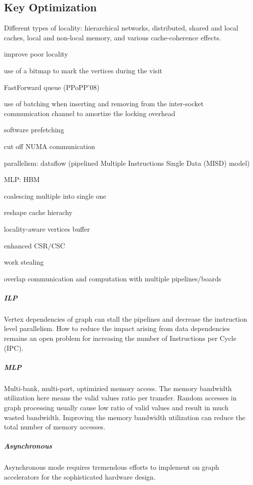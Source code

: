 \documentclass[UTF8,12pt,a4paper]{article}
\begin{document}
\subsection{Key Optimization}
Different types of locality:
hierarchical networks, distributed,
shared and local caches, local and non-local memory,
and various cache-coherence effects.
\begin{compactitem}
  \item improve poor locality
  \item use of a bitmap to mark the vertices during the visit
  \item FastForward queue (PPoPP'08)
  \item use of batching when inserting and removing
  from the inter-socket communication channel to amortize the locking overhead
  \item software prefetching
  \item cut off NUMA communication
  \item parallelism: dataflow (pipelined Multiple Instructions Single Data (MISD) model)
  \item MLP: HBM
  \item coalescing multiple into single one
  \item reshape cache hierachy
  \item locality-aware vertices buffer
  \item enhanced CSR/CSC
  \item work stealing
  \item overlap communication and computation with multiple pipelines/boards
\end{compactitem}

\subparagraph{ILP}
Vertex dependencies of graph can stall the pipelines
and decrease the instruction level parallelism.
How to reduce the impact arising from data dependencies
remains an open problem for increasing the number of Instructions per Cycle (IPC).

\subparagraph{MLP}
Multi-bank, multi-port, optimizied memory access.
The memory bandwidth utilization here means
the valid values ratio per transfer.
Random accesses in graph processing usually cause
low ratio of valid values and result in much wasted bandwidth.
Improving the memory bandwidth utilization can reduce the total number of memory accesses.

\subparagraph{Asynchronous}
Asynchronous mode requires tremendous efforts
to implement on graph accelerators for the sophisticated hardware design.
\end{document}

